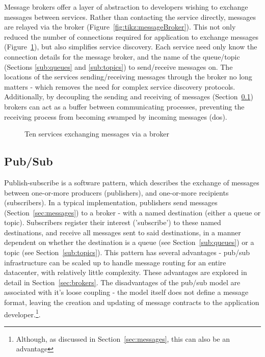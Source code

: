 Message brokers offer a layer of abstraction to developers wishing to exchange
messages between services. Rather than contacting the service directly, messages
are relayed via the broker (Figure~\ref{fig:tikz:messageBroker}). This not only
reduced the number of connections required for application to exchange messages
(Figure~\ref{fig:tikz:complexBrokerMessaging}), but also simplifies service
discovery. Each service need only know the connection details for the message
broker, and the name of the queue/topic (Sections \ref{sub:queues} and
\ref{sub:topics}) to send/receive messages on. The locations of the services
sending/receiving messages through the broker no long matters - which removes
the need for complex service discovery protocols. Additionally, by decoupling
the sending and receiving of messages (Section~\ref{sub:pubsub}) brokers can act
as a buffer between communicating processes, preventing the receiving process
from becoming swamped by incoming messages (\gls{dos}).

\begin{figure}[ht]
  \centering
  
  \caption{Ten services exchanging messages via a broker}
  \label{fig:tikz:complexBrokerMessaging}
\end{figure}

\subsection{Pub/Sub}
\label{sub:pubsub}

Publish-subscribe is a software pattern, which describes the exchange of
messages between one-or-more producers (publishers), and one-or-more recipients
(subscribers). In a typical implementation, publishers send messages
(Section~\ref{sec:messages}) to a broker - with a named destination (either a
queue or topic). Subscribers register their interest ('subscribe') to these
named destinations, and receive all messages sent to said destinations, in a
manner dependent on whether the destination is a queue (see
Section~\ref{sub:queues}) or a topic (see Section~\ref{sub:topics}). This
pattern has several advantages - pub/sub infrastructure can be scaled up to
handle message routing for an entire datacenter, with relatively little
complexity. These advantages are explored in detail in
Section~\ref{sec:brokers}. The disadvantages of the pub/sub model are associated
with it's loose coupling - the model itself does not define a message format,
leaving the creation and updating of message contracts to the application
developer.\footnote{Although, as discussed in Section~\ref{sec:messages}, this
can also be an advantage}.

